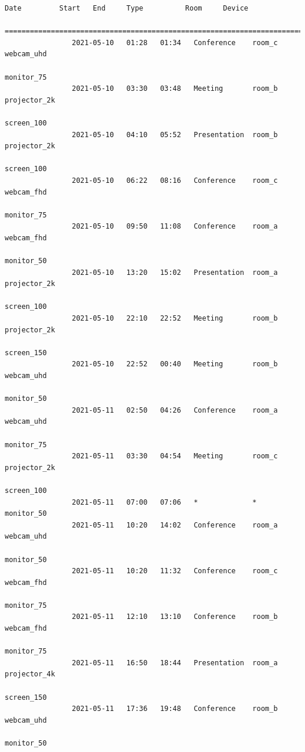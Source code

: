 \documentclass{article}
\begin{document}
\begin{Verbatim}[gobble=8]
                Date         Start   End     Type          Room     Device
                ===========================================================================
                2021-05-10   01:28   01:34   Conference    room_c   webcam_uhd
                                                                    monitor_75
                2021-05-10   03:30   03:48   Meeting       room_b   projector_2k
                                                                    screen_100
                2021-05-10   04:10   05:52   Presentation  room_b   projector_2k
                                                                    screen_100
                2021-05-10   06:22   08:16   Conference    room_c   webcam_fhd
                                                                    monitor_75
                2021-05-10   09:50   11:08   Conference    room_a   webcam_fhd
                                                                    monitor_50
                2021-05-10   13:20   15:02   Presentation  room_a   projector_2k
                                                                    screen_100
                2021-05-10   22:10   22:52   Meeting       room_b   projector_2k
                                                                    screen_150
                2021-05-10   22:52   00:40   Meeting       room_b   webcam_uhd
                                                                    monitor_50
                2021-05-11   02:50   04:26   Conference    room_a   webcam_uhd
                                                                    monitor_75
                2021-05-11   03:30   04:54   Meeting       room_c   projector_2k
                                                                    screen_100
                2021-05-11   07:00   07:06   *             *        monitor_50
                2021-05-11   10:20   14:02   Conference    room_a   webcam_uhd
                                                                    monitor_50
                2021-05-11   10:20   11:32   Conference    room_c   webcam_fhd
                                                                    monitor_75
                2021-05-11   12:10   13:10   Conference    room_b   webcam_fhd
                                                                    monitor_75
                2021-05-11   16:50   18:44   Presentation  room_a   projector_4k
                                                                    screen_150
                2021-05-11   17:36   19:48   Conference    room_b   webcam_uhd
                                                                    monitor_50

\end{Verbatim}
\end{document}
